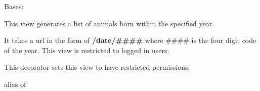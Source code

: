 \documentclass[letterpaper,10pt,english]{sphinxmanual}
\begin{document}
\begin{fulllineitems}
\label{api:mousedb.animal.views.AnimalMonthArchive}
Bases: \href{http://docs.djangoproject.com/en/dev/ref/class-based-views/\#django.views.generic.dates.MonthArchiveView}{}

This view generates a list of animals born within the specified year.

It takes a url in the form of \textbf{/date/\#\#\#\#} where \#\#\#\# is the four digit code of the year.
This view is restricted to logged in users.


\begin{fulllineitems}
\label{api:mousedb.animal.views.AnimalMonthArchive.dispatch}
This decorator sets this view to have restricted permissions.

\end{fulllineitems}



\begin{fulllineitems}
\label{api:mousedb.animal.views.AnimalMonthArchive.model}
alias of 

\end{fulllineitems}


\end{fulllineitems}


\end{document}
